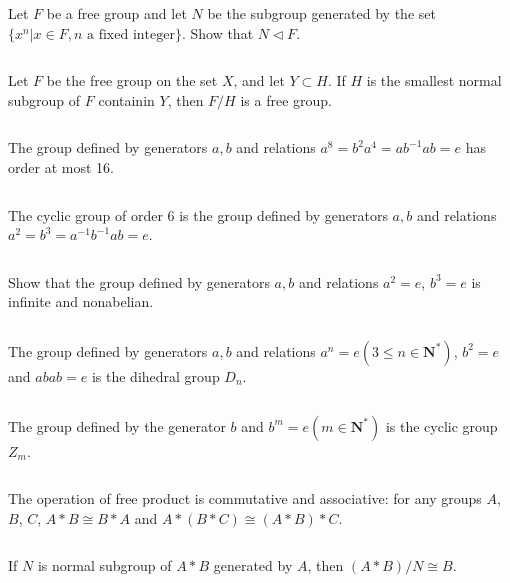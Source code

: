 $$ $$

\begin{ex}
    Let $F$ be a free group and let $N$ be the subgroup generated by the set $\{x^{n}|x\in F, n\text{ a fixed integer}\}$. Show that $N\lhd F$.
\end{ex}

$$ $$

\begin{ex}
    Let $F$ be the free group on the set $X$, and let $Y\subset H$. If $H$ is the smallest normal subgroup of $F$ containin $Y$, then $F /H$ is a free group.
\end{ex}

$$ $$

\begin{ex}
    The group defined by generators $a,b$ and relations $a^{8}=b^{2}a^{4}=ab^{-1}ab=e$ has order at most 16.
\end{ex}

$$ $$

\begin{ex}
    The cyclic group of order 6 is the group defined by generators $a, b$ and relations $a^{2}=b^{3}=a^{-1}b^{-1}ab=e$.
\end{ex}

$$ $$

\begin{ex}
    Show that the group defined by generators $a, b$ and relations $a^{2}=e$, $b^{3}=e$ is infinite and nonabelian.
\end{ex}

$$ $$

\begin{ex}
    The group defined by generators $a, b$ and relations $a^{n}=e (3\leq n\in \mathbf{N}^{*})$, $b^{2}=e$ and $abab=e$ is the dihedral group $D_{n}$.
\end{ex}

$$ $$

\begin{ex}
    The group defined by the generator $b$ and $b^{m}=e(m\in \mathbf{N}^{*})$ is the cyclic group $Z_{m}$.
\end{ex}

$$ $$

\begin{ex}
    The operation of free product is commutative and associative: for any groups $A$, $B$, $C$, $A*B\cong B*A$ and $A*(B*C)\cong (A*B)*C$.
\end{ex}

$$ $$

\begin{ex}
    If $N$ is normal subgroup of $A*B$ generated by $A$, then $(A*B) /N\cong B$.
\end{ex}


